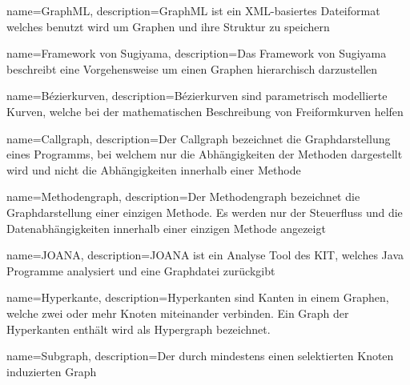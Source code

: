 {
  name=GraphML,
  description={GraphML ist ein XML-basiertes Dateiformat welches benutzt wird um Graphen und ihre Struktur zu speichern}
}

{
  name=Framework von Sugiyama,
  description={Das Framework von Sugiyama beschreibt eine Vorgehensweise um einen Graphen hierarchisch darzustellen}
}

{
  name=Bézierkurven,
  description={Bézierkurven sind parametrisch modellierte Kurven, welche bei der mathematischen Beschreibung von Freiformkurven helfen}
}

{
  name=Callgraph,
  description={Der Callgraph bezeichnet die Graphdarstellung eines Programms, bei welchem nur die Abhängigkeiten der Methoden dargestellt wird und nicht die Abhängigkeiten innerhalb einer Methode}
}

{
  name=Methodengraph,
  description={Der Methodengraph bezeichnet die Graphdarstellung einer einzigen Methode. Es werden nur der Steuerfluss und die Datenabhängigkeiten innerhalb einer einzigen Methode angezeigt}
}

{
  name=JOANA,
  description={JOANA ist ein Analyse Tool des KIT, welches Java Programme analysiert und eine Graphdatei zurückgibt}
}

{
  name=Hyperkante,
  description={Hyperkanten sind Kanten in einem Graphen, welche zwei oder mehr Knoten miteinander verbinden. Ein Graph der Hyperkanten enthält wird als Hypergraph bezeichnet.}
}

{
	name=Subgraph,
	description={Der durch mindestens einen selektierten Knoten induzierten Graph}
}


